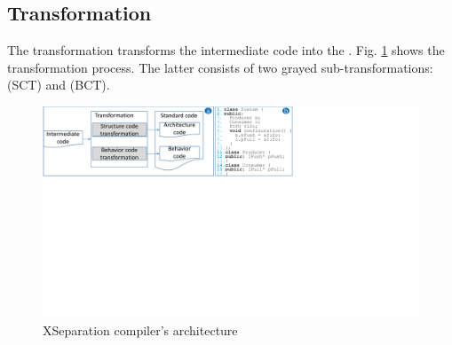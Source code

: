 \subsection{Transformation}
\label{subsec:compilation}
The transformation transforms the intermediate code into the . %
Fig. \ref{fig:compilerarchitecture} shows the transformation process.
The latter consists of two grayed sub-transformations:  (SCT) and  (BCT). 

\begin{figure}
	\centering
	\includegraphics[clip, trim=0cm 12.6cm 10.7cm 0cm, width=\columnwidth]{figures/compilerarchitecture-code.pdf}
	\caption{XSeparation compiler's architecture} 
	\label{fig:compilerarchitecture}
\end{figure}


